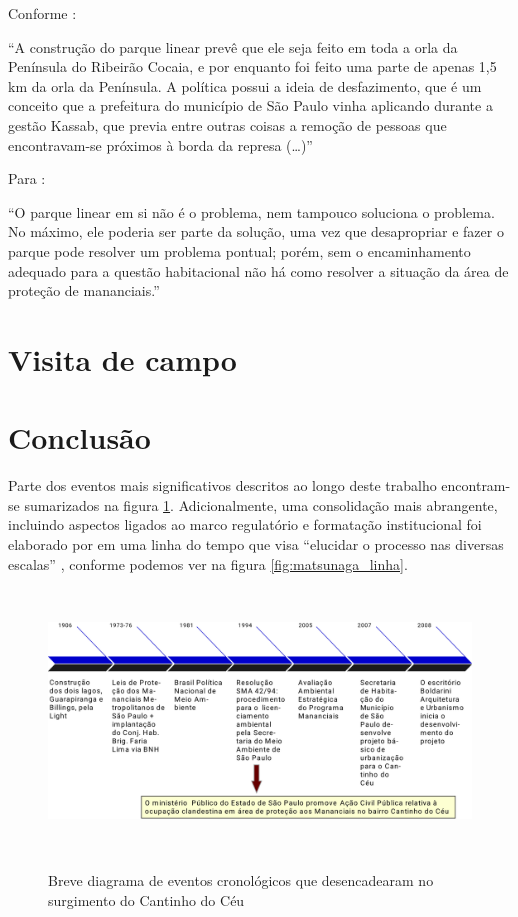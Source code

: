 	Conforme :
	
	\begin{citacao}
	    ``A construção do parque linear prevê que ele seja feito em toda a orla da Península do Ribeirão Cocaia, e por enquanto foi feito uma parte de apenas 1,5 km da orla da Península. A política possui a ideia de desfazimento, que é um conceito que a prefeitura do município de São Paulo vinha aplicando durante a gestão Kassab, que previa entre outras coisas a remoção de pessoas que encontravam-se próximos à borda da represa (\dots)''
    \end{citacao}
	
	Para :
	
	\begin{citacao}
	   ``O parque linear em si não é o problema, nem tampouco soluciona o problema. No máximo, ele poderia ser parte da solução, uma vez que desapropriar e fazer o parque pode resolver um problema pontual; porém, sem o encaminhamento adequado para a questão habitacional não há como resolver a situação da área de proteção de mananciais.''
	\end{citacao}
	
	\section{Visita de campo}
	
	
	\section{Conclusão}

	Parte dos eventos mais significativos descritos ao longo deste trabalho encontram-se sumarizados na figura \ref*{fig:cronologia}. Adicionalmente, uma consolidação mais abrangente, incluindo aspectos ligados ao marco regulatório e formatação institucional foi elaborado por  em uma linha do tempo que visa ``elucidar o processo nas diversas escalas'' \cite[p.37]{Matsunaga2015}, conforme podemos ver na figura \ref*{fig:matsunaga_linha}.
	
	\begin{figure}[H]
		\centering
		\caption[Cronologia do surgimento do Cantinho do Céu]{Breve diagrama de eventos cronológicos que desencadearam no surgimento do Cantinho do Céu}
		\includegraphics[height=7cm]{img/cronologia}
		\label{fig:cronologia}
	\end{figure}
	
